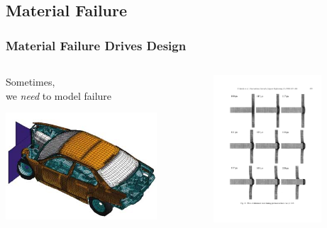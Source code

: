 \documentclass{beamer}
\begin{document}
\subsection*{Material Failure}
%
\begin{frame}
  \frametitle{Material Failure Drives Design}
  
       \begin{columns}[t] %
     \begin{column}[B]{5cm} %
  	Sometimes, \\
	we \textit{need} to model failure
	
	\vspace{.5cm}
	\centering
         \includegraphics[height = 4cm]{FEM_car_crash1.jpg}
          
          \vspace{0pt}
     \end{column}
       \begin{column}[B]{5cm} %
       
       \centering
         \includegraphics[height=5.5cm]{platePenetrationBorvik}
          
         \vspace{0pt}
     \end{column}
     \end{columns}
     
            \begin{columns}[t] %
     \begin{column}[t]{5cm} %


\end{column}
\end{columns}
\end{frame}
\end{document}
